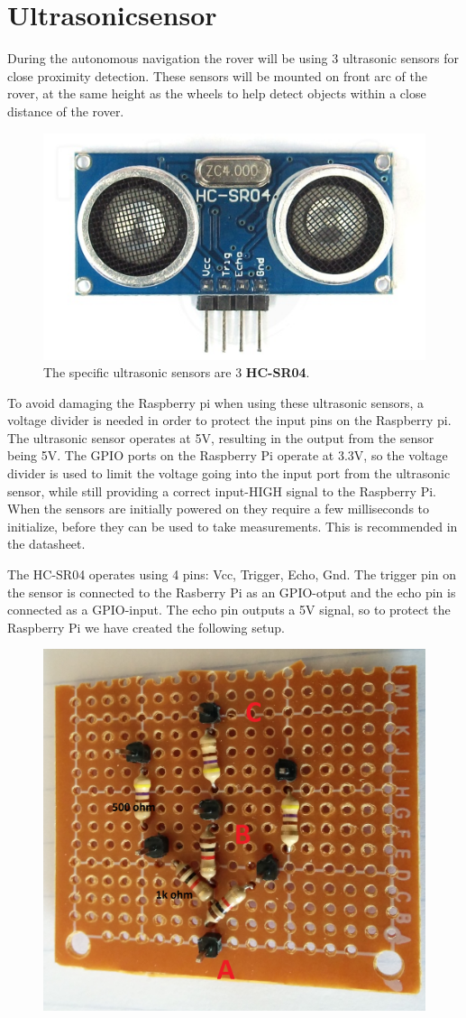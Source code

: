 \clearpage
\section{Ultrasonicsensor}

During the autonomous navigation the rover will be using 3 ultrasonic sensors for close proximity detection. These sensors will be mounted on front arc of the rover, at the same height as the wheels to help detect objects within a close distance of the rover.

\begin{figure}[H]
	\centering
	\includegraphics[width=.3\linewidth]{images/hcsr40.jpg}
	\caption{The specific ultrasonic sensors are 3 \textbf{HC-SR04}.}
\end{figure}


To avoid damaging the Raspberry pi when using these ultrasonic sensors, a voltage divider is needed in order to protect the input pins on the Raspberry pi. The ultrasonic sensor operates at 5V, resulting in the output from the sensor being 5V. The GPIO ports on the Raspberry Pi operate at 3.3V, so the voltage divider is used to limit the voltage going into the input port from the ultrasonic sensor, while still providing a correct input-HIGH signal to the Raspberry Pi.
When the sensors are initially powered on they require a few milliseconds to initialize, before they can be used to take measurements. This is recommended in the datasheet.\cite{hcsr40datesheet}

The HC-SR04 operates using 4 pins: Vcc, Trigger, Echo, Gnd.
The trigger pin on the sensor is connected to the Rasberry Pi as an GPIO-otput and the echo pin is connected as a GPIO-input. The echo pin outputs a 5V signal, so to protect the Raspberry Pi we have created the following setup.

\begin{figure}[H]
	\centering
	\includegraphics[width=.3\linewidth]{images/vd_labelled.jpg}
\end{figure}


